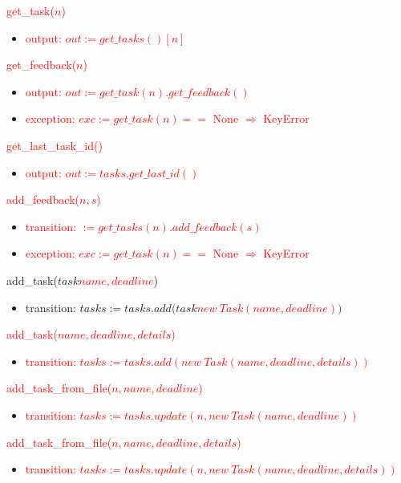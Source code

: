 \documentclass[12pt, titlepage]{article}
\begin{document}
\noindent \textcolor{red}{get\_task($n$)}
\begin{itemize}
    \item \textcolor{red}{output: $out := get\_tasks()[n]$}
\end{itemize}

\noindent \textcolor{red}{get\_feedback($n$)}
\begin{itemize}
    \item \textcolor{red}{output: $out := get\_task(n).get\_feedback()$}
    \item \textcolor{red}{exception: $exc := get\_task(n) ==$ None $\Rightarrow$ KeyError}
\end{itemize}

\noindent \textcolor{red}{get\_last\_task\_id()}
\begin{itemize}
    \item \textcolor{red}{output: $out := tasks.get\_last\_id()$}
\end{itemize}

\noindent \textcolor{red}{add\_feedback($n, s$)}
\begin{itemize}
    \item \textcolor{red}{transition: $:= get\_tasks(n).add\_feedback(s)$}
    \item \textcolor{red}{exception: $exc := get\_task(n) ==$ None $\Rightarrow$ KeyError}
\end{itemize}

\noindent add\_task(\sout{$task$}\textcolor{red}{$name,deadline$})
\begin{itemize}
    \item transition: $tasks := tasks.add($\sout{$task$}\textcolor{red}{$new\ Task(name, deadline)$}$)$
\end{itemize}

\noindent \textcolor{red}{add\_task($name,deadline,details$)}
\begin{itemize}
    \item \textcolor{red}{transition: $tasks := tasks.add(new\ Task(name, deadline, details))$}
\end{itemize}

\noindent \textcolor{red}{add\_task\_from\_file($n, name, deadline$)}
\begin{itemize}
    \item \textcolor{red}{transition: $tasks := tasks.update(n, new\ Task(name, deadline))$}
\end{itemize}

\noindent \textcolor{red}{add\_task\_from\_file($n, name, deadline, details$)}
\begin{itemize}
    \item \textcolor{red}{transition: $tasks := tasks.update(n, new\ Task(name, deadline, details))$}
\end{itemize}
\end{document}
